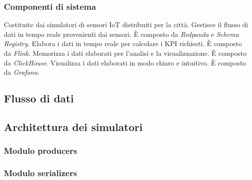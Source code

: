 \subsubsection{Componenti di sistema}
Costituite dai simulatori di sensori IoT distribuiti per la città.
Gestisce il flusso di dati in tempo reale provenienti dai sensori. È composto da \textit{Redpanda} e \textit{Schema Registry}.
Elabora i dati in tempo reale per calcolare i KPI richiesti. È composto da \textit{Flink}.
Memorizza i dati elaborati per l'analisi e la visualizzazione. È composto da \textit{ClickHouse}.
Visualizza i dati elaborati in modo chiaro e intuitivo. È composto da \textit{Grafana}.

\subsection{Flusso di dati}
\subsection{Architettura dei simulatori}
\subsubsection{Modulo producers}
\subsubsection{Modulo serializers}
